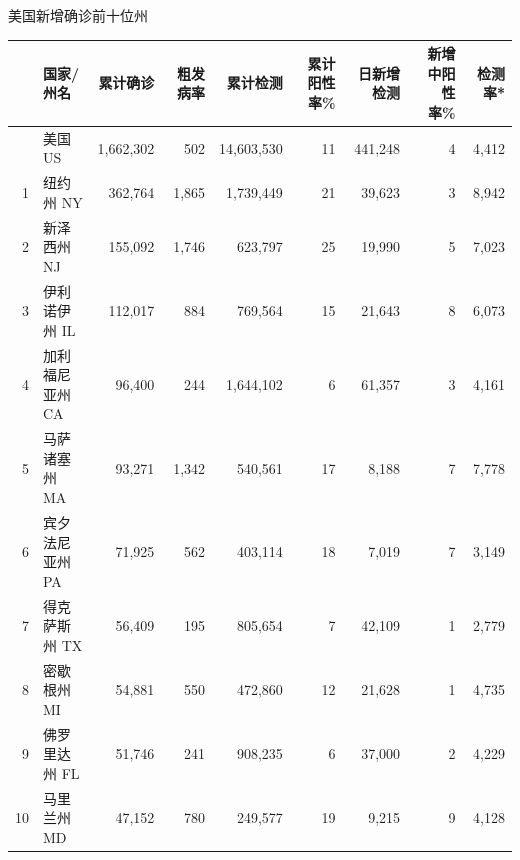\documentclass[]{article}
\begin{document}
\begin{table}[H]
      \centering
    \begin{minipage}{.4\linewidth}
    \caption{美国新增确诊前十位州}
    \vspace{-0.5\baselineskip}
      \centering
    \captionsetup{justification=centering} \begin{table}[H]
\centering\begingroup\fontsize{12}{14}\selectfont

\begin{tabular}{rlrrrrrrr}
\toprule
  & 国家/州名 & 累计确诊 & 粗发病率 & 累计检测 & 累计阳性率\% & 日新增检测 & 新增中阳性率\% & 检测率*\\
\midrule
\rowcolor{gray!6}   & 美国 US & 1,662,302 & 502 & 14,603,530 & 11 & 441,248 & 4 & 4,412\\
1 & 纽约州 NY & 362,764 & 1,865 & 1,739,449 & 21 & 39,623 & 3 & 8,942\\
\rowcolor{gray!6}  2 & 新泽西州 NJ & 155,092 & 1,746 & 623,797 & 25 & 19,990 & 5 & 7,023\\
3 & 伊利诺伊州 IL & 112,017 & 884 & 769,564 & 15 & 21,643 & 8 & 6,073\\
\rowcolor{gray!6}  4 & 加利福尼亚州 CA & 96,400 & 244 & 1,644,102 & 6 & 61,357 & 3 & 4,161\\
5 & 马萨诸塞州 MA & 93,271 & 1,342 & 540,561 & 17 & 8,188 & 7 & 7,778\\
\rowcolor{gray!6}  6 & 宾夕法尼亚州 PA & 71,925 & 562 & 403,114 & 18 & 7,019 & 7 & 3,149\\
7 & 得克萨斯州 TX & 56,409 & 195 & 805,654 & 7 & 42,109 & 1 & 2,779\\
\rowcolor{gray!6}  8 & 密歇根州 MI & 54,881 & 550 & 472,860 & 12 & 21,628 & 1 & 4,735\\
9 & 佛罗里达州 FL & 51,746 & 241 & 908,235 & 6 & 37,000 & 2 & 4,229\\
\rowcolor{gray!6}  10 & 马里兰州 MD & 47,152 & 780 & 249,577 & 19 & 9,215 & 9 & 4,128\\
\bottomrule
\end{tabular}
\endgroup{}
\end{table} \end{minipage}%
    \begin{minipage}{.7\linewidth}
     \caption{美国新增死亡前十位州}
     \vspace{-0.5\baselineskip}
      \centering
    \captionsetup{justification=centering} \begin{table}[H]
\centering\begingroup\fontsize{12}{14}\selectfont


\end{table}
\end{minipage}
\end{table}
\end{document}
